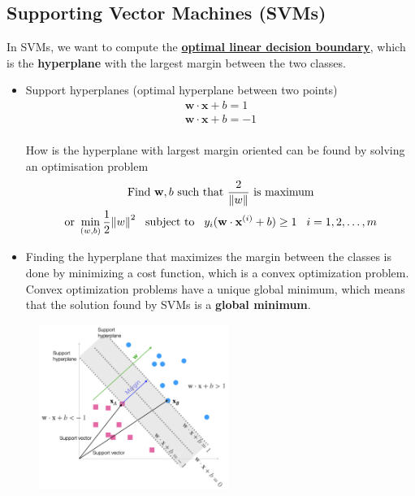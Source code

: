\documentclass[a4paper,10pt]{article}
\begin{document}
\subsection{Supporting Vector Machines (SVMs)}
In SVMs, we want to compute the \underline{\textbf{optimal linear decision boundary}}, which is the \textbf{hyperplane} with the largest margin between the two classes.
\begin{itemize}
    \item Support hyperplanes (optimal hyperplane between two points)
    \begin{gather*}
        \mathbf{w}\cdot\mathbf{x} + b = 1\\
        \mathbf{w}\cdot\mathbf{x} + b = -1\\
    \end{gather*}

    \vspace*{-0.8cm}
    How is the hyperplane with largest margin oriented can be found by solving an optimisation problem
    \begin{gather*}
        \text{Find }\mathbf{w},b\text{ such that }\frac{2}{\lVert w \rVert}\text{ is maximum}\\
        \text{or }\min\limits_{(w,b)}\frac{1}{2}{\lVert w \rVert}^2\hspace*{0.3cm}\text{subject to}\hspace*{0.3cm}y_i(\mathbf{w}\cdot\mathbf{x}^{(i)}+b)\geq1\hspace*{0.3cm}i = 1,2,\dots,m
    \end{gather*}
    \item Finding the hyperplane that maximizes the margin between the classes is done by minimizing a cost function, which is a convex optimization problem. Convex optimization problems have a unique global minimum, which means that the solution found by SVMs is a \textbf{global minimum}.
\end{itemize}
\begin{figure}[H]
    \centering
    \includegraphics[width =0.55\textwidth]{svm.png}
\end{figure}
\end{document}
